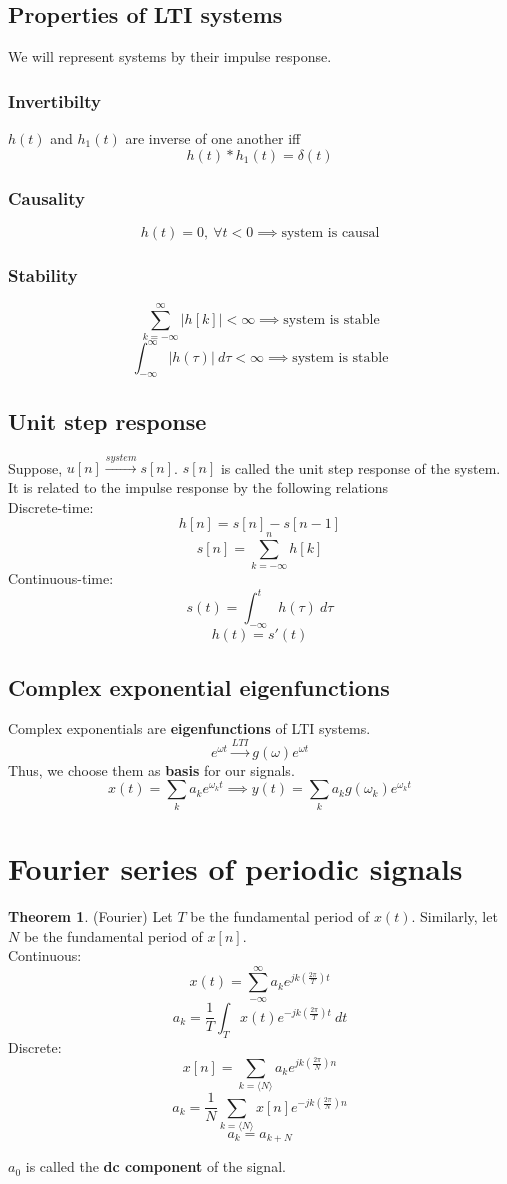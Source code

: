 \documentclass[10pt, a4paper]{extarticle}
\theoremstyle{definition}
\newtheorem*{thm}{Theorem}
\begin{document}
	\subsection{Properties of LTI systems}
	We will represent systems by their impulse response.
	\subsubsection{Invertibilty}
	$h(t)$ and $h_1(t)$ are inverse of one another iff \[h(t)*h_1(t)=\delta(t)\]
	\subsubsection{Causality}
	\[h(t)=0,\ \forall t<0\implies\text{system is causal}\]
	\subsubsection{Stability}
	\[\sum_{k=-\infty}^{\infty}|h[k]|<\infty\implies\text{system is stable}\]
	\[\int_{-\infty}^{\infty}|h(\tau)|\ d\tau<\infty\implies\text{system is stable}\]

	\subsection{Unit step response}
	Suppose, $u[n]\xrightarrow{system}s[n]$. $s[n]$ is called the unit step response of the system.\\
	It is related to the impulse response by the following relations\\
	Discrete-time:
	\[h[n]=s[n]-s[n-1]\]
	  \[s[n]=\sum_{k=-\infty}^nh[k]\]
	Continuous-time:
\[s(t)=\int_{-\infty}^{t}h(\tau)\ d\tau\]
	  \[h(t)=s'(t)\]

	  \subsection{Complex exponential eigenfunctions}
	  Complex exponentials are \textbf{eigenfunctions} of LTI systems.
	  \[e^{\omega t}\xrightarrow{LTI}g(\omega)e^{\omega t}\]
	  Thus, we choose them as \textbf{basis} for our signals.
		\[x(t)=\sum_ka_ke^{\omega_k t}\implies y(t)=\sum_k a_kg(\omega_k)e^{\omega_k t}\]

		\section{Fourier series of periodic signals}
		\begin{thm}(Fourier)
			Let $T$ be the fundamental period of $x(t)$. Similarly, let $N$ be the fundamental period of $x[n]$.\\
			Continuous:
			\[x(t)=\sum_{-\infty}^{\infty}a_ke^{jk\left(\frac{2\pi}{T}\right)t}\tag*{(synthesis)}\]
			\[a_k=\frac{1}{T}\int_Tx(t)e^{-jk\left(\frac{2\pi}{T}\right)t}\ dt\tag*{(analysis)}\]
			Discrete:
			\[x[n]=\sum_{k=\langle N\rangle}a_ke^{jk\left(\frac{2\pi}{N}\right)n}\tag*{(synthesis)}\]
			\[a_k=\frac{1}{N}\sum_{k=\langle N\rangle}x[n]e^{-jk\left(\frac{2\pi}{N}\right)n}\tag*{(analysis)}\]
			\[a_k=a_{k+N}\]
		\end{thm}
		$a_0$ is called the \textbf{dc component} of the signal.
\end{document}
